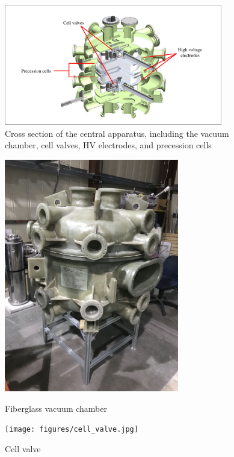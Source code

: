 
\begin{figure}
    \centering
    \includegraphics[width=0.85\textwidth]{figures/vacuum_chamber_cross.pdf}
    \caption
    {Cross section of the central apparatus, including the vacuum chamber, cell valves, HV electrodes, and precession cells}
    \label{fig:central_app_cross}
\end{figure}

\begin{figure}
\centering
\begin{minipage}{.5\textwidth}
    \centering
    \includegraphics[height=4in]{figures/vacuum_chamber.jpg}
    \caption{Fiberglass vacuum chamber}
    \label{fig:vacuum_chamber}
\end{minipage}%
\begin{minipage}{.5\textwidth}
    \centering
    \texttt{[image: figures/cell\_valve.jpg]}
    \caption
    {Cell valve}
    \label{fig:cell_valve}
\end{minipage}
\end{figure}

